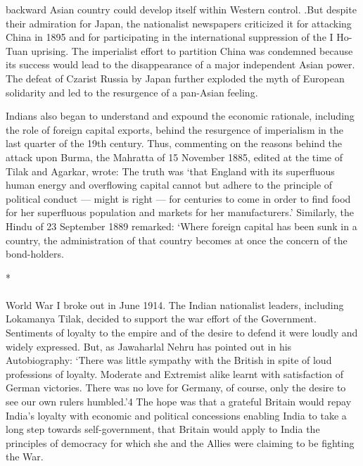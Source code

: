 \begin{multicols}{2}
backward Asian country could develop itself within Western control. .But despite their admiration for Japan, the nationalist newspapers criticized it for attacking China in 1895 and for participating in the international suppression of the I Ho- Tuan uprising. The imperialist effort to partition China was condemned because its success would lead to the disappearance of a major independent Asian power. The defeat of Czarist Russia by Japan further exploded the myth of European solidarity and led to the resurgence of a pan-Asian feeling. 

Indians also began to understand and expound the economic rationale, including the role of foreign capital exports, behind the resurgence of imperialism in the last quarter of the 19th century. Thus, commenting on the reasons behind the attack upon Burma, the Mahratta of 15 November 1885, edited at the time of Tilak and Agarkar, wrote: The truth was `that England with its superfluous human energy and overflowing capital cannot but adhere to the principle of political conduct --- might is right --- for centuries to come in order to find food for her superfluous population and markets for her manufacturers.' Similarly, the Hindu of 23 September 1889 remarked: `Where foreign capital has been sunk in a country, the administration of that country becomes at once the concern of the bond-holders.

\begin{center}*\end{center}

\paragraph*{}

World War I broke out in June 1914. The Indian nationalist leaders, including Lokamanya Tilak, decided to support the war effort of the Government. Sentiments of loyalty to the empire and of the desire to defend it were loudly and widely expressed. But, as Jawaharlal Nehru has pointed out in his Autobiography: `There was little sympathy with the British in spite of loud professions of loyalty. Moderate and Extremist alike learnt with satisfaction of German victories. There was no love for Germany, of course, only the desire to see our own rulers humbled.'4 The hope was that a grateful Britain would repay India's loyalty with economic and political concessions enabling India to take a long step towards self-government, that Britain would apply to India the principles of democracy for which she and the Allies were claiming to be fighting the War. 


\end{multicols}
